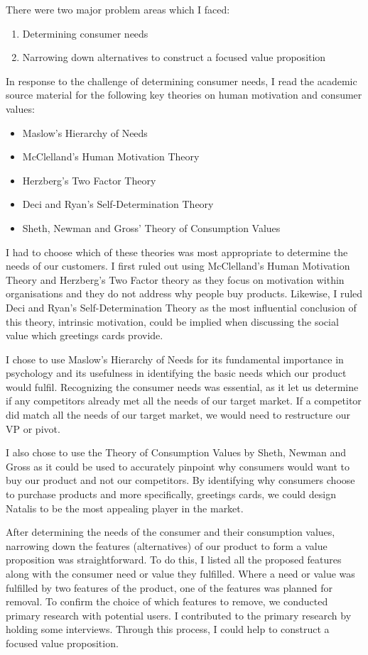 \documentclass[10pt,a4paper]{article}
\begin{document}
\begin{appendices}
There were two major problem areas which I faced:
\begin{enumerate}
  \item Determining consumer needs
  \item Narrowing down alternatives to construct a focused value proposition
\end{enumerate}
In response to the challenge of determining consumer needs, I read the academic source material for the following key theories on human motivation and consumer values:
\begin{itemize}
  \item Maslow's Hierarchy of Needs
  \item McClelland's Human Motivation Theory
  \item Herzberg's Two Factor Theory
  \item Deci and Ryan's Self-Determination Theory
  \item Sheth, Newman and Gross' Theory of Consumption Values
\end{itemize}

I had to choose which of these theories was most appropriate to determine the needs of our customers. I first ruled out using McClelland's Human Motivation Theory and Herzberg's Two Factor theory as they focus on motivation within organisations and they do not address why people buy products. Likewise, I ruled Deci and Ryan's Self-Determination Theory as the most influential conclusion of this theory, intrinsic motivation, could be implied when discussing the social value \citep{sheth1991we} which greetings cards provide.

I chose to use Maslow's Hierarchy of Needs for its fundamental importance in psychology and its usefulness in identifying the basic needs which our product would fulfil. Recognizing the consumer needs was essential, as it let us determine if any competitors already met all the needs of our target market. If a competitor did match all the needs of our target market, we would need to restructure our VP or pivot.

I also chose to use the Theory of Consumption Values by Sheth, Newman and Gross as it could be used to accurately pinpoint why consumers would want to buy our product and not our competitors. By identifying why consumers choose to purchase products and more specifically, greetings cards, we could design Natalis to be the most appealing player in the market.

After determining the needs of the consumer and their consumption values, narrowing down the features (alternatives) of our product to form a value proposition was straightforward. To do this, I listed all the proposed features along with the consumer need or value they fulfilled. Where a need or value was fulfilled by two features of the product, one of the features was planned for removal. To confirm the choice of which features to remove, we conducted primary research with potential users. I contributed to the primary research by holding some interviews. Through this process, I could help to construct a focused value proposition.


\end{appendices}
\end{document}
